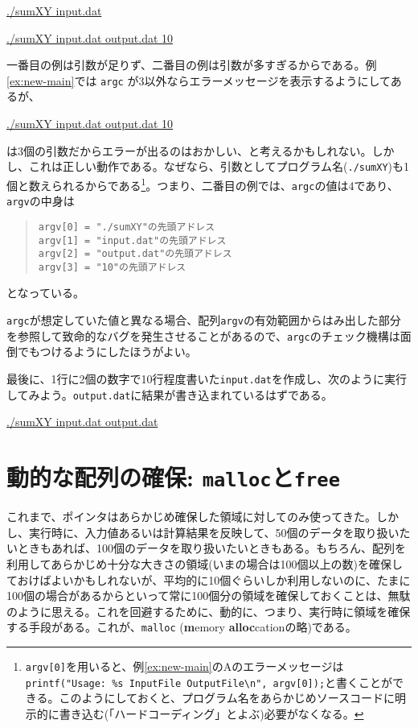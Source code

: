 \begin{commandline2}
    \prompt \underline{./sumXY input.dat}
\end{commandline2} \noindent
\begin{commandline2}
    \prompt \underline{./sumXY input.dat output.dat 10}
\end{commandline2} \noindent
一番目の例は引数が足りず、二番目の例は引数が多すぎるからである。例\ref{ex:new-main}では \texttt{argc} が3以外ならエラーメッセージを表示するようにしてあるが、
\begin{commandline2}
    \prompt \underline{./sumXY input.dat output.dat 10}
\end{commandline2} \noindent
は3個の引数だからエラーが出るのはおかしい、と考えるかもしれない。しかし、これは正しい動作である。なぜなら、引数としてプログラム名(\texttt{./sumXY})も1個と数えられるからである\footnote{\texttt{argv[0]}を用いると、例\ref{ex:new-main}のAのエラーメッセージは \texttt{printf("Usage: \%s InputFile OutputFile\textbackslash n", argv[0]);}と書くことができる。このようにしておくと、プログラム名をあらかじめソースコードに明示的に書き込む(「ハードコーディング」とよぶ)必要がなくなる。}。つまり、二番目の例では、\texttt{argc}の値は4であり、\texttt{argv}の中身は
\begin{quote}
    \begin{verbatim}
argv[0] = "./sumXY"の先頭アドレス
argv[1] = "input.dat"の先頭アドレス
argv[2] = "output.dat"の先頭アドレス
argv[3] = "10"の先頭アドレス
\end{verbatim}
\end{quote}
となっている。

\texttt{argc}が想定していた値と異なる場合、配列\texttt{argv}の有効範囲からはみ出した部分を参照して致命的なバグを発生させることがあるので、\texttt{argc}のチェック機構は面倒でもつけるようにしたほうがよい。

最後に、1行に2個の数字で10行程度書いた\texttt{input.dat}を作成し、次のように実行してみよう。\texttt{output.dat}に結果が書き込まれているはずである。
\begin{commandline2}
    \prompt \underline{./sumXY input.dat output.dat}
\end{commandline2}

\section{動的な配列の確保: \texttt{malloc}と\texttt{free}}
\label{sec:clang:malloc}

これまで、ポインタはあらかじめ確保した領域に対してのみ使ってきた。しかし、実行時に、入力値あるいは計算結果を反映して、50個のデータを取り扱いたいときもあれば、100個のデータを取り扱いたいときもある。もちろん、配列を利用してあらかじめ十分な大きさの領域(いまの場合は100個以上の数)を確保しておけばよいかもしれないが、平均的に10個ぐらいしか利用しないのに、たまに100個の場合があるからといって常に100個分の領域を確保しておくことは、無駄のように思える。これを回避するために、動的に、つまり、実行時に領域を確保する手段がある。これが、\texttt{malloc} (\textbf{m}emory \textbf{alloc}cationの略)である。

